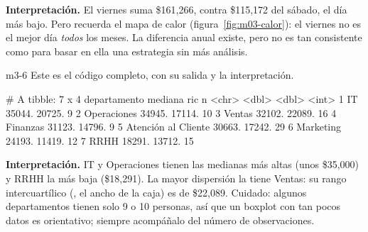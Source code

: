 \textbf{Interpretación.} El viernes suma \$161,266, contra \$115,172 del
sábado, el día más bajo. Pero recuerda el mapa de calor
(figura~\ref{fig:m03-calor}): el viernes no es el mejor día \emph{todos}
los meses. La diferencia anual existe, pero no es tan consistente como para
basar en ella una estrategia sin más análisis.


\begin{solucion}{m3-6}
Este es el código completo, con su salida y la interpretación.
\end{solucion}

\begin{rsalida}
# A tibble: 7 x 4
  departamento        mediana    ric     n
  <chr>                 <dbl>  <dbl> <int>
1 IT                   35044. 20725.     9
2 Operaciones          34945. 17114.    10
3 Ventas               32102. 22089.    16
4 Finanzas             31123. 14796.     9
5 Atención al Cliente  30663. 17242.    29
6 Marketing            24193. 11419.    12
7 RRHH                 18291. 13712.    15
\end{rsalida}

\textbf{Interpretación.} IT y Operaciones tienen las medianas más altas
(unos \$35,000) y RRHH la más baja (\$18,291). La mayor dispersión la
tiene Ventas: su rango intercuartílico (, el ancho de la caja)
es de \$22,089. Cuidado: algunos departamentos tienen
solo 9 o 10 personas, así que un boxplot con tan pocos datos es
orientativo; siempre acompáñalo del número de observaciones.


